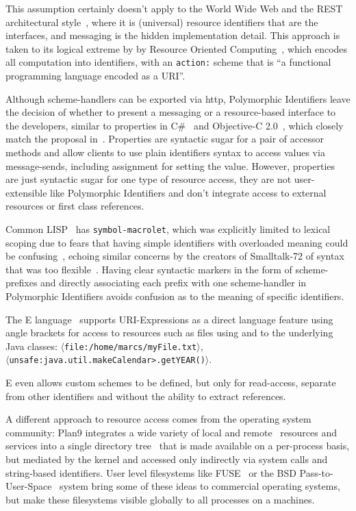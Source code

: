 \documentclass[preprint]{sigplanconf}
\begin{document}
This assumption certainly doesn't apply to the World Wide Web and the REST architectural style~\cite{fielding-rest}, where
it is (universal) resource identifiers that are the interfaces, and messaging is the hidden implementation detail.  This 
approach is taken to its logical extreme by  by Resource Oriented Computing~\cite{roc},
which encodes all computation into identifiers, with an {\tt action:} scheme that is ``a functional programming language encoded as a URI''.

Although scheme-handlers can be exported via http, Polymorphic Identifiers leave the decision of whether to present a messaging
or a resource-based interface to the developers,
similar to properties in C\#~\cite{Archer:2001:IC:516715} and Objective-C 2.0~\cite{Kochan:2009:PO:1538451}, which closely match the proposal in~\cite{Spinellis:2002:MPC:510857.510868}.  Properties are syntactic sugar for a pair of accessor methods and allow clients to use 
 plain identifiers syntax to access values via message-sends, including assignment for setting the value.   However, properties
 are just syntactic sugar for one type of resource access, they are not user-extensible like Polymorphic Identifiers 
 and don't integrate access to external resources or first class references.

Common LISP~\cite{Steele:1990:CLL:95411} has {\tt symbol-macrolet}, which was explicitly limited to lexical scoping due to fears 
that having simple identifiers with overloaded meaning could be confusing~\cite{gabriel-lisp-identifiers}, echoing similar concerns by the creators
of Smalltalk-72 of syntax that was too flexible~\cite{Kay:1996:EHS:234286.1057828}.  Having clear syntactic markers in the form of scheme-prefixes
and directly associating each prefix with one scheme-handler in Polymorphic Identifiers avoids confusion as to the meaning of specific identifiers.

The E language~\cite{MillerRobustComposition}  supports URI-Expressions as a direct language feature using angle brackets for access to 
resources such as files using and to the underlying Java classes:   {\tt $\langle$file:/home/marcs/myFile.txt$\rangle$},  \\ {\tt $\langle$unsafe:java.util.makeCalendar>.getYEAR()$\rangle$}.

E even allows custom schemes to be defined, but  only for read-access, separate from other identifiers and without the ability to extract references.

A different approach to resource access comes from the operating system community:  Plan9 
integrates a wide variety of local and remote~\cite{plan9network} resources and services into a single directory tree~\cite{plan9names} that is made available on a per-process basis, but mediated by the kernel and accessed only indirectly via system calls and string-based
identifiers.
User level filesystems like FUSE~\cite{fuse} or the BSD Pass-to-User-Space~\cite{kantee:puffs} 
system bring some of these ideas to commercial operating systems, but make these filesystems visible globally to all
processes on a machines. 
\end{document}
